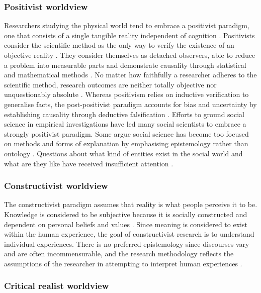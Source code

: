 \subsubsection{Positivist worldview}

Researchers studying the physical world tend to embrace a positivist paradigm, one that consists of a single tangible reality independent of cognition \citep{van2007engaged}. Positivists consider the scientific method as the only way to verify the existence of an objective reality \citep{creswell2011designing}. They consider themselves as detached observers, able to reduce a problem into measurable parts and demonstrate causality through statistical and mathematical methods \citep{easterby2015management}. No matter how faithfully a researcher adheres to the scientific method, research outcomes are neither totally objective nor unquestionably absolute \citep[][p. 40]{crotty1998foundations}. Whereas positivism relies on inductive verification to generalise facts, the post-positivist paradigm accounts for bias and uncertainty by establishing causality through deductive falsification \citep{van2007engaged,chilisa2012selecting}. Efforts to ground social science in empirical investigations have led many social scientists to embrace a strongly positivist paradigm. Some argue social science has become too focused on methods and forms of explanation by emphasising epistemology rather than ontology \citep{welch2011theorising}. Questions about what kind of entities exist in the social world and what are they like have received insufficient attention \citep{archer2016what}. 

\subsubsection{Constructivist worldview}

The constructivist paradigm assumes that reality is what people perceive it to be. Knowledge is considered to be subjective because it is socially constructed and dependent on personal beliefs and values \citep{chilisa2012selecting}. Since meaning is considered to exist within the human experience, the goal of constructivist research is to understand individual experiences. There is no preferred epistemology since discourses vary and are often incommensurable, and the research methodology reflects the assumptions of the researcher in attempting to interpret human experiences \citep{van2007engaged}. 

\subsubsection{Critical realist worldview}

